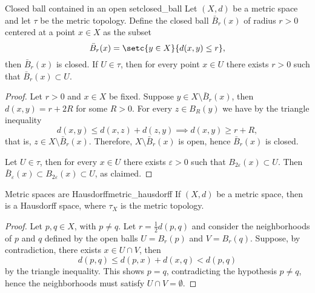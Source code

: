\begin{proposition}{Closed ball contained in an open set}{closed_ball}
    Let \((X, d)\) be a metric space and let \(\tau\) be the metric topology. Define the closed ball \(\bar{B}_r(x)\) of radius \(r > 0\) centered at a point \(x \in X\) as the subset
    \begin{equation*}
        \bar{B}_r(x) = \setc{y \in X}{d(x,y) \leq r},
    \end{equation*}
    then \(\bar{B}_r(x)\) is closed. If \(U \in \tau\), then for every point \(x \in U\) there exists \(r > 0\) such that \(\bar{B}_r(x) \subset U\).
\end{proposition}
\begin{proof}
    Let \(r > 0\) and \(x \in X\) be fixed. Suppose \(y \in X \setminus \bar{B}_r(x)\), then \(d(x,y) = r + 2R\) for some \(R > 0\). For every \(z \in B_R(y)\) we have by the triangle inequality
    \begin{equation*}
        d(x,y) \leq d(x,z) + d(z,y) \implies d(x,y) \geq r + R,
    \end{equation*}
    that is, \(z \in X\setminus \bar{B}_r(x)\). Therefore, \(X \setminus \bar{B}_r(x)\) is open, hence \(\bar{B}_r(x)\) is closed.

    Let \(U \in \tau\), then for every \(x \in U\) there exists \(\varepsilon > 0\) such that \(B_{2\varepsilon}(x) \subset U\). Then \(\bar{B}_{\varepsilon}(x) \subset B_{2 \varepsilon}(x) \subset U\), as claimed.
\end{proof}

\begin{proposition}{Metric spaces are Hausdorff}{metric_hausdorff}
    If \((X, d)\) be a metric space, then  is a Hausdorff space, where \(\tau_X\) is the metric topology.
\end{proposition}
\begin{proof}
    Let \(p, q \in X\), with \(p \neq q\). Let \(r = \frac12d(p, q)\) and consider the neighborhoods of \(p\) and \(q\) defined by the open balls \(U = B_r(p)\) and \(V = B_r(q)\). Suppose, by contradiction, there exists \(x \in U \cap V\), then
    \begin{equation*}
        d(p,q) \leq d(p, x) + d(x, q) < d(p, q)
    \end{equation*}
    by the triangle inequality. This shows \(p = q\), contradicting the hypothesis \(p \neq q\), hence the neighborhoods must satisfy \(U \cap V = \emptyset\).
\end{proof}

